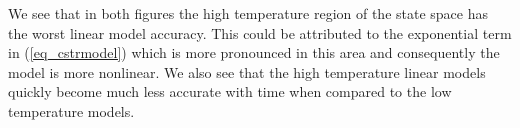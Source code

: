 \documentclass[../masters.tex]{subfiles}
\begin{document}
We see that in both figures the high temperature region of the state space has the worst linear model accuracy. This could be attributed to the exponential term in (\ref{eq_cstrmodel}) which is more pronounced in this area and consequently the model is more nonlinear. We also see that the high temperature linear models quickly become much less accurate with time when compared to the low temperature models.




\end{document}
